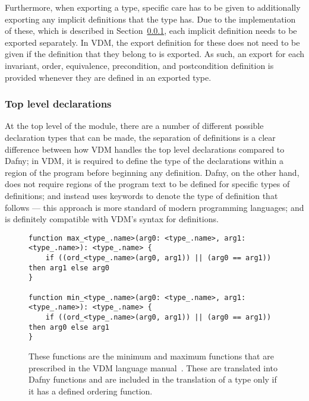 \documentclass{entcs}
\begin{document}
Furthermore, when exporting a type, specific care has to be given to additionally exporting any implicit definitions that the type has. Due to the implementation of these, which is described in Section~\ref{section:translating_declarations}, each implicit definition needs to be exported separately. In VDM, the export definition for these does not need to be given if the definition that they belong to is exported. As such, an export for each invariant, order, equivalence, precondition, and postcondition definition is provided whenever they are defined in an exported type.

\subsubsection{Top level declarations}\label{section:translating_declarations}

At the top level of the module, there are a number of different possible declaration types that can be made, the separation of definitions is a clear difference between how VDM handles the top level declarations compared to Dafny; in VDM, it is required to define the type of the declarations within a region of the program before beginning any definition. Dafny, on the other hand, does not require regions of the program text to be defined for specific types of definitions; and instead uses keywords to denote the type of definition that follows --- this approach is more standard of modern programming languages; and is definitely compatible with VDM's syntax for definitions.

\begin{figure}[h]
	\begin{center}
        \begin{lstlisting}[language=Dafny]
function max_<type_.name>(arg0: <type_.name>, arg1: <type_.name>): <type_.name> {
    if ((ord_<type_.name>(arg0, arg1)) || (arg0 == arg1)) then arg1 else arg0
}

function min_<type_.name>(arg0: <type_.name>, arg1: <type_.name>): <type_.name> {
    if ((ord_<type_.name>(arg0, arg1)) || (arg0 == arg1)) then arg0 else arg1
}
        \end{lstlisting}
		\caption{These functions are the minimum and maximum functions that are prescribed in the VDM language manual~\cite{VDMMiniMaxExcerpt}. These are translated into Dafny functions and are included in the translation of a type only if it has a defined ordering function.}\label{fig:dafny_max_and_min}
	\end{center}
\end{figure}
\end{document}
